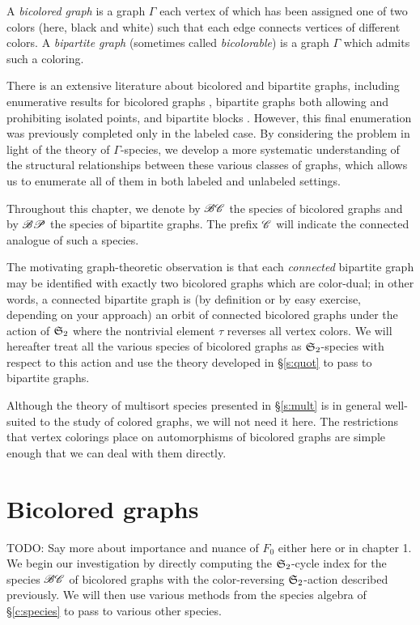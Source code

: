 \documentclass[sectionflow,singlespace,twoside,boldmathhdr,draft]{brandiss} %
\numberwithin{section}{chapter}
\numberwithin{figure}{chapter}
\begin{document}
\begin{definition}
  \label{def:bcgraph}
  A \emph{bicolored graph} is a graph $\Gamma$ each vertex of which has been assigned one of two colors (here, black and white) such that each edge connects vertices of different colors.
  A \emph{bipartite graph} (sometimes called \emph{bicolorable}) is a graph $\Gamma$ which admits such a coloring.  
\end{definition}

There is an extensive literature about bicolored and bipartite graphs, including enumerative results for bicolored graphs \cite{har:bicolored}, bipartite graphs both allowing \cite{han:bipartite} and prohibiting \cite{harprins:bipartite} isolated points, and bipartite blocks \cite{harrob:bipblocks}.
However, this final enumeration was previously completed only in the labeled case.
By considering the problem in light of the theory of $\Gamma$-species, we develop a more systematic understanding of the structural relationships between these various classes of graphs, which allows us to enumerate all of them in both labeled and unlabeled settings.

Throughout this chapter, we denote by $\mathscr{BC}$ the species of bicolored graphs and by $\mathscr{BP}$ the species of bipartite graphs.
The prefix $\mathscr{C}$ will indicate the connected analogue of such a species.

The motivating graph-theoretic observation is that each \emph{connected} bipartite graph may be identified with exactly two bicolored graphs which are color-dual; in other words, a connected bipartite graph is (by definition or by easy exercise, depending on your approach) an orbit of connected bicolored graphs under the action of $ \mathfrak{S}_{2} $ where the nontrivial element $\tau$ reverses all vertex colors.
We will hereafter treat all the various species of bicolored graphs as $ \mathfrak{S}_{2} $-species with respect to this action and use the theory developed in \S \ref{s:quot} to pass to bipartite graphs.

Although the theory of multisort species presented in \S \ref{s:mult} is in general well-suited to the study of colored graphs, we will not need it here.
The restrictions that vertex colorings place on automorphisms of bicolored graphs are simple enough that we can deal with them directly.

\section{Bicolored graphs}\label{s:bcgraph}
TODO: Say more about importance and nuance of $F_{0}$ either here or in chapter 1.
We begin our investigation by directly computing the $ \mathfrak{S}_{2} $-cycle index for the species $\mathscr{BC}$ of bicolored graphs with the color-reversing $ \mathfrak{S}_{2} $-action described previously.
We will then use various methods from the species algebra of \S \ref{c:species} to pass to various other species.
\end{document}
